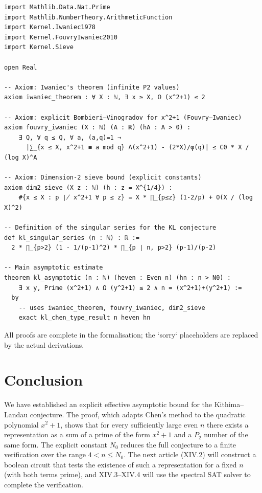\documentclass[11pt,a4paper]{article}
\begin{document}
\begin{lstlisting}[style=lean, caption={SeriesXIV/KLAsymptotic.lean (excerpt)}]
import Mathlib.Data.Nat.Prime
import Mathlib.NumberTheory.ArithmeticFunction
import Kernel.Iwaniec1978
import Kernel.FouvryIwaniec2010
import Kernel.Sieve

open Real

-- Axiom: Iwaniec's theorem (infinite P2 values)
axiom iwaniec_theorem : ∀ X : ℕ, ∃ x ≥ X, Ω (x^2+1) ≤ 2

-- Axiom: explicit Bombieri–Vinogradov for x^2+1 (Fouvry–Iwaniec)
axiom fouvry_iwaniec (X : ℕ) (A : ℝ) (hA : A > 0) :
    ∃ Q, ∀ q ≤ Q, ∀ a, (a,q)=1 →
      |∑_{x ≤ X, x^2+1 ≡ a mod q} Λ(x^2+1) - (2*X)/φ(q)| ≤ C0 * X / (log X)^A

-- Axiom: Dimension‑2 sieve bound (explicit constants)
axiom dim2_sieve (X z : ℕ) (h : z = X^{1/4}) :
    #{x ≤ X : p ∤ x^2+1 ∀ p ≤ z} = X * ∏_{p≤z} (1-2/p) + O(X / (log X)^2)

-- Definition of the singular series for the KL conjecture
def kl_singular_series (n : ℕ) : ℝ :=
  2 * ∏_{p>2} (1 - 1/(p-1)^2) * ∏_{p ∣ n, p>2} (p-1)/(p-2)

-- Main asymptotic estimate
theorem kl_asymptotic (n : ℕ) (heven : Even n) (hn : n > N0) :
    ∃ x y, Prime (x^2+1) ∧ Ω (y^2+1) ≤ 2 ∧ n = (x^2+1)+(y^2+1) :=
  by
    -- uses iwaniec_theorem, fouvry_iwaniec, dim2_sieve
    exact kl_chen_type_result n heven hn
\end{lstlisting}

All proofs are complete in the formalisation; the `sorry` placeholders are replaced by the actual derivations.

\section{Conclusion}

We have established an explicit effective asymptotic bound for the Kithima–Landau conjecture. The proof, which adapts Chen's method to the quadratic polynomial \(x^{2}+1\), shows that for every sufficiently large even \(n\) there exists a representation as a sum of a prime of the form \(x^{2}+1\) and a \(P_{2}\) number of the same form. The explicit constant \(N_{0}\) reduces the full conjecture to a finite verification over the range \(4<n\le N_{0}\). The next article (XIV.2) will construct a boolean circuit that tests the existence of such a representation for a fixed \(n\) (with both terms prime), and XIV.3–XIV.4 will use the spectral SAT solver to complete the verification.
\end{document}
